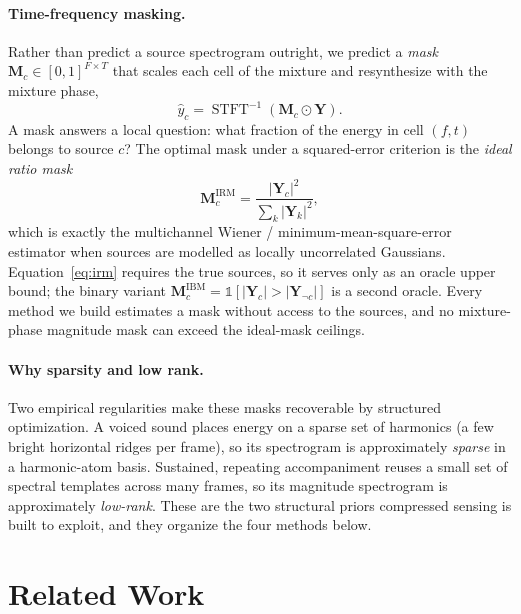 \documentclass{article}
\DeclareMathOperator{\STFT}{STFT}
\newcommand{\M}{\bm{M}}
\newcommand{\Y}{\bm{Y}}
\begin{document}
\paragraph{Time-frequency masking.}
Rather than predict a source spectrogram outright, we predict a \emph{mask}
$\M_c\in[0,1]^{F\times T}$ that scales each cell of the mixture and resynthesize
with the mixture phase,
\begin{equation}
\hat y_c=\STFT^{-1}(\M_c\odot\Y).
\end{equation}
A mask answers a local question: what fraction of the energy in cell $(f,t)$
belongs to source $c$? The optimal mask under a squared-error criterion is the
\emph{ideal ratio mask}
\begin{equation}
\label{eq:irm}
\M_c^{\mathrm{IRM}}=\frac{\lvert\Y_c\rvert^2}{\sum_k\lvert\Y_k\rvert^2},
\end{equation}
which is exactly the multichannel Wiener / minimum-mean-square-error estimator when
sources are modelled as locally uncorrelated Gaussians. Equation~\eqref{eq:irm}
requires the true sources, so it serves only as an oracle upper bound; the binary
variant $\M_c^{\mathrm{IBM}}=\mathbb 1[\lvert\Y_c\rvert>\lvert\Y_{\neg c}\rvert]$ is a
second oracle. Every method we build estimates a mask without access to the
sources, and no mixture-phase magnitude mask can exceed the ideal-mask ceilings.

\paragraph{Why sparsity and low rank.}
Two empirical regularities make these masks recoverable by structured optimization.
A voiced sound places energy on a sparse set of harmonics (a few bright horizontal
ridges per frame), so its spectrogram is approximately \emph{sparse} in a
harmonic-atom basis. Sustained, repeating accompaniment reuses a small set of
spectral templates across many frames, so its magnitude spectrogram is approximately
\emph{low-rank}. These are the two structural priors compressed sensing is built to
exploit, and they organize the four methods below.

\section{Related Work}
\label{sec:related}
\end{document}

